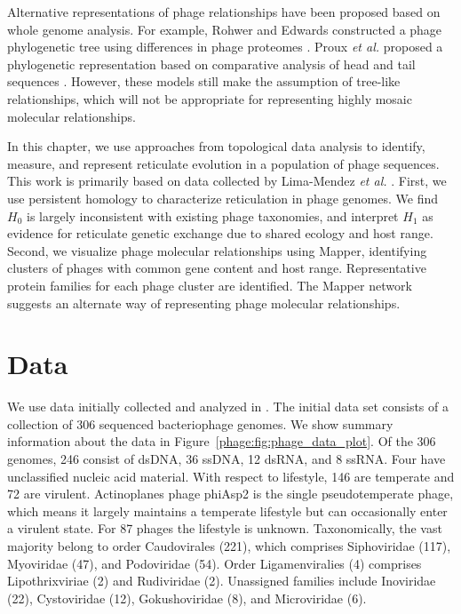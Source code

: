 Alternative representations of phage relationships have been proposed based on whole genome analysis.
For example, Rohwer and Edwards constructed a phage phylogenetic tree using differences in phage proteomes \cite{Rohwer:2002uo}.
Proux \emph{et al.} proposed a phylogenetic representation based on comparative analysis of head and tail sequences \cite{Proux:2002gj}.
However, these models still make the assumption of tree-like relationships, which will not be appropriate for representing highly mosaic molecular relationships.

In this chapter, we use approaches from topological data analysis to identify, measure, and represent reticulate evolution in a population of phage sequences.
This work is primarily based on data collected by Lima-Mendez \emph{et al.} \cite{LimaMendez:2008ki}.
First, we use persistent homology to characterize reticulation in phage genomes.
We find $H_0$ is largely inconsistent with existing phage taxonomies, and interpret $H_1$ as evidence for reticulate genetic exchange due to shared ecology and host range.
Second, we visualize phage molecular relationships using Mapper, identifying clusters of phages with common gene content and host range.
Representative protein families for each phage cluster are identified.
The Mapper network suggests an alternate way of representing phage molecular relationships.

\section{Data}

We use data initially collected and analyzed in \cite{LimaMendez:2008ki}.
The initial data set consists of a collection of 306 sequenced bacteriophage genomes.
We show summary information about the data in Figure~\ref{phage:fig:phage_data_plot}.
Of the 306 genomes, 246 consist of dsDNA, 36 ssDNA, 12 dsRNA, and 8 ssRNA.
Four have unclassified nucleic acid material.
With respect to lifestyle, 146 are temperate and 72 are virulent.
Actinoplanes phage phiAsp2 is the single pseudotemperate phage, which means it largely maintains a temperate lifestyle but can occasionally enter a virulent state.
For 87 phages the lifestyle is unknown.
Taxonomically, the vast majority belong to order Caudovirales (221), which comprises Siphoviridae (117), Myoviridae (47), and Podoviridae (54). 
Order Ligamenviralies (4) comprises Lipothrixviriae (2) and Rudiviridae (2).
Unassigned families include Inoviridae (22), Cystoviridae (12), Gokushoviridae (8), and Microviridae (6).

